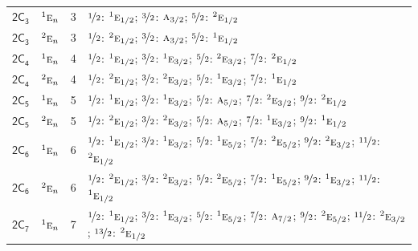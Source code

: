 \documentclass[10pt,a4paper]{article}
\numberwithin{equation}{section}
\newcommand{\grp}[1]{\mathsf{#1}}
\newcommand{\irr}[1]{\text{\normalfont\scshape #1}}
\newcommand{\conjpair}[1]{{}^{#1}}
\newlength{\fillwidth}\newlength{\cellwidth}\newlength{\colwidth}
\begin{document}
{\begin{longtable}{@{}llr>{\RaggedRight\arraybackslash}p{\fillwidth}@{}}
\href{2C3.pdf}{$\grp{2C_{3}}$} & $\conjpair{1}\irr{e}_{n}$ & 3 & $\nicefrac{1}{2}$: $\conjpair{1}\irr{e}_{1/2}$; $\nicefrac{3}{2}$: $\irr{a}_{3/2}$; $\nicefrac{5}{2}$: $\conjpair{2}\irr{e}_{1/2}$\\
\href{2C3.pdf}{$\grp{2C_{3}}$} & $\conjpair{2}\irr{e}_{n}$ & 3 & $\nicefrac{1}{2}$: $\conjpair{2}\irr{e}_{1/2}$; $\nicefrac{3}{2}$: $\irr{a}_{3/2}$; $\nicefrac{5}{2}$: $\conjpair{1}\irr{e}_{1/2}$\\
\href{2C4.pdf}{$\grp{2C_{4}}$} & $\conjpair{1}\irr{e}_{n}$ & 4 & $\nicefrac{1}{2}$: $\conjpair{1}\irr{e}_{1/2}$; $\nicefrac{3}{2}$: $\conjpair{1}\irr{e}_{3/2}$; $\nicefrac{5}{2}$: $\conjpair{2}\irr{e}_{3/2}$; $\nicefrac{7}{2}$: $\conjpair{2}\irr{e}_{1/2}$\\
\href{2C4.pdf}{$\grp{2C_{4}}$} & $\conjpair{2}\irr{e}_{n}$ & 4 & $\nicefrac{1}{2}$: $\conjpair{2}\irr{e}_{1/2}$; $\nicefrac{3}{2}$: $\conjpair{2}\irr{e}_{3/2}$; $\nicefrac{5}{2}$: $\conjpair{1}\irr{e}_{3/2}$; $\nicefrac{7}{2}$: $\conjpair{1}\irr{e}_{1/2}$\\
\href{2C5.pdf}{$\grp{2C_{5}}$} & $\conjpair{1}\irr{e}_{n}$ & 5 & $\nicefrac{1}{2}$: $\conjpair{1}\irr{e}_{1/2}$; $\nicefrac{3}{2}$: $\conjpair{1}\irr{e}_{3/2}$; $\nicefrac{5}{2}$: $\irr{a}_{5/2}$; $\nicefrac{7}{2}$: $\conjpair{2}\irr{e}_{3/2}$; $\nicefrac{9}{2}$: $\conjpair{2}\irr{e}_{1/2}$\\
\href{2C5.pdf}{$\grp{2C_{5}}$} & $\conjpair{2}\irr{e}_{n}$ & 5 & $\nicefrac{1}{2}$: $\conjpair{2}\irr{e}_{1/2}$; $\nicefrac{3}{2}$: $\conjpair{2}\irr{e}_{3/2}$; $\nicefrac{5}{2}$: $\irr{a}_{5/2}$; $\nicefrac{7}{2}$: $\conjpair{1}\irr{e}_{3/2}$; $\nicefrac{9}{2}$: $\conjpair{1}\irr{e}_{1/2}$\\
\href{2C6.pdf}{$\grp{2C_{6}}$} & $\conjpair{1}\irr{e}_{n}$ & 6 & $\nicefrac{1}{2}$: $\conjpair{1}\irr{e}_{1/2}$; $\nicefrac{3}{2}$: $\conjpair{1}\irr{e}_{3/2}$; $\nicefrac{5}{2}$: $\conjpair{1}\irr{e}_{5/2}$; $\nicefrac{7}{2}$: $\conjpair{2}\irr{e}_{5/2}$; $\nicefrac{9}{2}$: $\conjpair{2}\irr{e}_{3/2}$; $\nicefrac{11}{2}$: $\conjpair{2}\irr{e}_{1/2}$\\
\href{2C6.pdf}{$\grp{2C_{6}}$} & $\conjpair{2}\irr{e}_{n}$ & 6 & $\nicefrac{1}{2}$: $\conjpair{2}\irr{e}_{1/2}$; $\nicefrac{3}{2}$: $\conjpair{2}\irr{e}_{3/2}$; $\nicefrac{5}{2}$: $\conjpair{2}\irr{e}_{5/2}$; $\nicefrac{7}{2}$: $\conjpair{1}\irr{e}_{5/2}$; $\nicefrac{9}{2}$: $\conjpair{1}\irr{e}_{3/2}$; $\nicefrac{11}{2}$: $\conjpair{1}\irr{e}_{1/2}$\\
\href{2C7.pdf}{$\grp{2C_{7}}$} & $\conjpair{1}\irr{e}_{n}$ & 7 & $\nicefrac{1}{2}$: $\conjpair{1}\irr{e}_{1/2}$; $\nicefrac{3}{2}$: $\conjpair{1}\irr{e}_{3/2}$; $\nicefrac{5}{2}$: $\conjpair{1}\irr{e}_{5/2}$; $\nicefrac{7}{2}$: $\irr{a}_{7/2}$; $\nicefrac{9}{2}$: $\conjpair{2}\irr{e}_{5/2}$; $\nicefrac{11}{2}$: $\conjpair{2}\irr{e}_{3/2}$; $\nicefrac{13}{2}$: $\conjpair{2}\irr{e}_{1/2}$\\

\end{longtable}}
\end{document}
